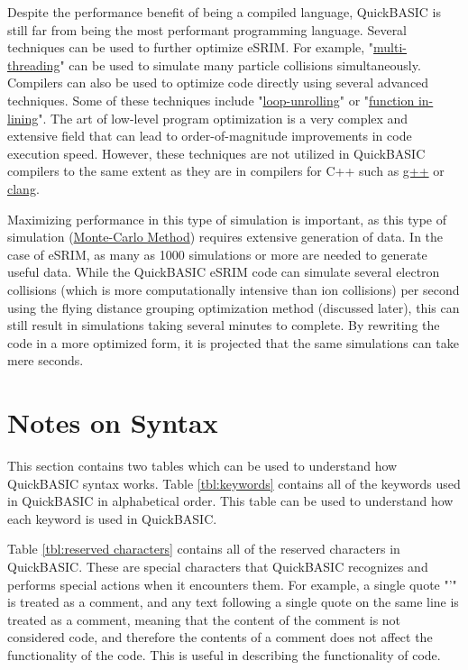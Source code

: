 \documentclass[10pt, reqno]{exam}
\begin{document}
Despite the performance benefit of being a compiled language, QuickBASIC is still far from being the most performant programming language. Several techniques can be used to further optimize eSRIM. For example, "\href{https://en.wikipedia.org/wiki/Multithreading_(computer_architecture)}{multi-threading}" can be used to simulate many particle collisions simultaneously. Compilers can also be used to optimize code directly using several advanced techniques. Some of these techniques include "\href{https://en.wikipedia.org/wiki/Loop_unrolling}{loop-unrolling}" or "\href{https://en.wikipedia.org/wiki/Inline_expansion}{function in-lining}". The art of low-level program optimization is a very complex and extensive field that can lead to order-of-magnitude improvements in code execution speed. However, these techniques are not utilized in QuickBASIC compilers to the same extent as they are in compilers for C++ such as \href{https://en.wikipedia.org/wiki/GNU_Compiler_Collection}{g++} or \href{https://en.wikipedia.org/wiki/Clang}{clang}. \par

Maximizing performance in this type of simulation is important, as this type of simulation (\href{https://en.wikipedia.org/wiki/Monte_Carlo_method}{Monte-Carlo Method}) requires extensive generation of data. In the case of eSRIM, as many as 1000 simulations or more are needed to generate useful data. While the QuickBASIC eSRIM code can simulate several electron collisions (which is more computationally intensive than ion collisions) per second using the flying distance grouping optimization method (discussed later), this can still result in simulations taking several minutes to complete. By rewriting the code in a more optimized form, it is projected that the same simulations can take mere seconds. \par

\clearpage

\section{Notes on Syntax}
\label{sec:syntax}

This section contains two tables which can be used to understand how QuickBASIC syntax works. Table \ref{tbl:keywords} contains all of the keywords used in QuickBASIC in alphabetical order. This table can be used to understand how each keyword is used in QuickBASIC. \par

Table \ref{tbl:reserved characters} contains all of the reserved characters in QuickBASIC. These are special characters that QuickBASIC recognizes and performs special actions when it encounters them. For example, a single quote "'" is treated as a comment, and any text following a single quote on the same line is treated as a comment, meaning that the content of the comment is not considered code, and therefore the contents of a comment does not affect the functionality of the code. This is useful in describing the functionality of code. \par
\end{document}
